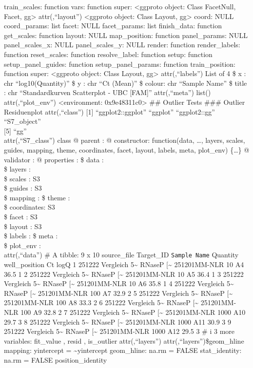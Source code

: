 \documentclass[
]{article}
\begin{document}
train\_scales: function vars: function super: \textless ggproto object:
Class FacetNull, Facet, gg\textgreater{} attr(,``layout'')
\textless ggproto object: Class Layout, gg\textgreater{} coord: NULL
coord\_params: list facet: NULL facet\_params: list finish\_data:
function get\_scales: function layout: NULL map\_position: function
panel\_params: NULL panel\_scales\_x: NULL panel\_scales\_y: NULL
render: function render\_labels: function reset\_scales: function
resolve\_label: function setup: function setup\_panel\_guides: function
setup\_panel\_params: function train\_position: function super:
\textless ggproto object: Class Layout, gg\textgreater{}
attr(,``labels'') List of 4 \$ x : chr ``log10(Quantity)'' \$ y : chr
``Ct (Mean)'' \$ colour: chr ``Sample Name'' \$ title : chr
``Standardkurven Scatterplot - UBC {[}FAM{]}'' attr(,``meta'') list()
attr(,``plot\_env'') \textless environment: 0x9e48311c0\textgreater{}
\n\#\# Outlier Tests \n\n\#\#\# Outlier Residuenplot \n\n
attr(,``class'') {[}1{]} ``ggplot2::ggplot'' ``ggplot'' ``ggplot2::gg''
``S7\_object''\\
{[}5{]} ``gg''\\
attr(,``S7\_class'') class @ parent : @ constructor: function(data,
\ldots, layers, scales, guides, mapping, theme, coordinates, facet,
layout, labels, meta, plot\_env) \{\ldots\} @ validator : @ properties :
\$ data : \\
\$ layers : \\
\$ scales : S3\\
\$ guides : S3\\
\$ mapping : \$ theme : \\
\$ coordinates: S3\\
\$ facet : S3\\
\$ layout : S3\\
\$ labels : \$ meta : \\
\$ plot\_env : \\
attr(,``data'') \# A tibble: 9 x 10 source\_file Target\_ID
\texttt{Sample\ Name} Quantity well\_position Ct logQ 1 251222 Vergleich
5\textasciitilde{} RNaseP {[}\textasciitilde{} 251201MM-NLR 10 A4 36.5 1
2 251222 Vergleich 5\textasciitilde{} RNaseP {[}\textasciitilde{}
251201MM-NLR 10 A5 36.4 1 3 251222 Vergleich 5\textasciitilde{} RNaseP
{[}\textasciitilde{} 251201MM-NLR 10 A6 35.8 1 4 251222 Vergleich
5\textasciitilde{} RNaseP {[}\textasciitilde{} 251201MM-NLR 100 A7 32.9
2 5 251222 Vergleich 5\textasciitilde{} RNaseP {[}\textasciitilde{}
251201MM-NLR 100 A8 33.3 2 6 251222 Vergleich 5\textasciitilde{} RNaseP
{[}\textasciitilde{} 251201MM-NLR 100 A9 32.8 2 7 251222 Vergleich
5\textasciitilde{} RNaseP {[}\textasciitilde{} 251201MM-NLR 1000 A10
29.7 3 8 251222 Vergleich 5\textasciitilde{} RNaseP {[}\textasciitilde{}
251201MM-NLR 1000 A11 30.9 3 9 251222 Vergleich 5\textasciitilde{}
RNaseP {[}\textasciitilde{} 251201MM-NLR 1000 A12 29.5 3 \# i 3 more
variables: fit\_value , resid , is\_outlier attr(,``layers'')
attr(,``layers'')\$geom\_hline mapping: yintercept =
\textasciitilde yintercept geom\_hline: na.rm = FALSE stat\_identity:
na.rm = FALSE position\_identity
\end{document}
